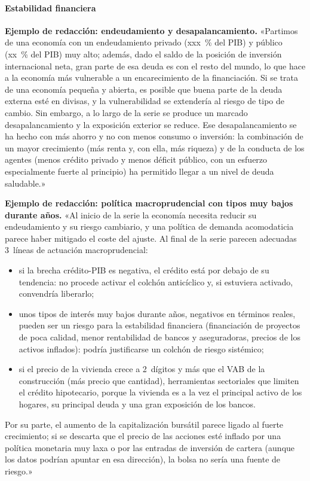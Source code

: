 \documentclass[11pt]{article}
\begin{document}
\paragraph{Estabilidad financiera}
\begin{anotaciones}
\textbf{Ejemplo de redacción: endeudamiento y desapalancamiento.}
«Partimos de una economía con un endeudamiento privado (xxx~\% del PIB) y público (xx~\% del PIB) muy alto; además, dado el saldo de la posición de inversión internacional neta, gran parte de esa deuda es con el resto del mundo, lo que hace a la economía más vulnerable a un encarecimiento de la financiación. Si se trata de una economía pequeña y abierta, es posible que buena parte de la deuda externa esté en divisas, y la vulnerabilidad se extendería al riesgo de tipo de cambio. Sin embargo, a lo largo de la serie se produce un marcado desapalancamiento y la exposición exterior se reduce. Ese desapalancamiento se ha hecho con más ahorro y no con menos consumo o inversión: la combinación de un mayor crecimiento (más renta y, con ella, más riqueza) y de la conducta de los agentes (menos crédito privado y menos déficit público, con un esfuerzo especialmente fuerte al principio) ha permitido llegar a un nivel de deuda saludable.»
\end{anotaciones}

\begin{anotaciones}
\textbf{Ejemplo de redacción: política macroprudencial con tipos muy bajos durante años.}
«Al inicio de la serie la economía necesita reducir su endeudamiento y su riesgo cambiario, y una política de demanda acomodaticia parece haber mitigado el coste del ajuste. Al final de la serie parecen adecuadas 3~líneas de actuación macroprudencial:
\begin{itemize}
\item si la brecha crédito-PIB es negativa, el crédito está por debajo de su tendencia: no procede activar el colchón anticíclico y, si estuviera activado, convendría liberarlo;
\item unos tipos de interés muy bajos durante años, negativos en términos reales, pueden ser un riesgo para la estabilidad financiera (financiación de proyectos de poca calidad, menor rentabilidad de bancos y aseguradoras, precios de los activos inflados): podría justificarse un colchón de riesgo sistémico;
\item si el precio de la vivienda crece a 2~dígitos y más que el VAB de la construcción (más precio que cantidad), herramientas sectoriales que limiten el crédito hipotecario, porque la vivienda es a la vez el principal activo de los hogares, su principal deuda y una gran exposición de los bancos.
\end{itemize}
Por su parte, el aumento de la capitalización bursátil parece ligado al fuerte crecimiento; si se descarta que el precio de las acciones esté inflado por una política monetaria muy laxa o por las entradas de inversión de cartera (aunque los datos podrían apuntar en esa dirección), la bolsa no sería una fuente de riesgo.»
\end{anotaciones}
\end{document}

